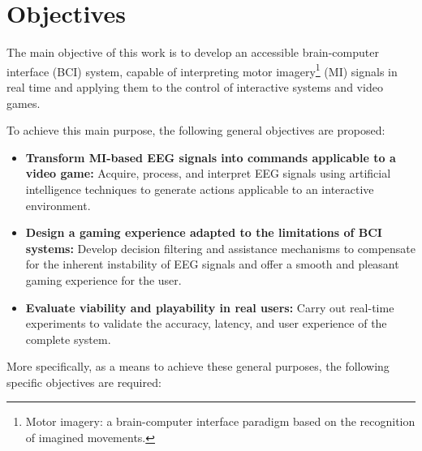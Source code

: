 \section*{Objectives}

The main objective of this work is to develop an accessible brain-computer
interface (BCI) system, capable of interpreting motor
imagery\footnote{Motor imagery: a brain-computer interface paradigm based on the recognition of imagined movements.} (MI) signals in real time and applying them to the control of interactive systems and video games.

To achieve this main purpose, the following general objectives are proposed:

\begin{itemize}

    \item \textbf{Transform MI-based EEG signals into commands applicable to a video game:}
          Acquire, process, and interpret EEG signals using artificial intelligence techniques to generate actions applicable to an interactive environment.

    \item \textbf{Design a gaming experience adapted to the limitations of BCI systems:}
          Develop decision filtering and assistance mechanisms to compensate for the inherent instability of EEG signals and offer a smooth and pleasant gaming experience for the user.

    \item \textbf{Evaluate viability and playability in real users:}
          Carry out real-time experiments to validate the accuracy, latency, and user experience of the complete system.

\end{itemize}

More specifically, as a means to achieve these general purposes, the following
specific objectives are required:

